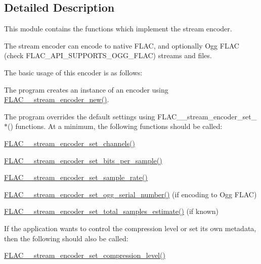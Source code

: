 \subsection{Detailed Description}
This module contains the functions which implement the stream encoder. 

The stream encoder can encode to native F\+L\+AC, and optionally Ogg F\+L\+AC (check F\+L\+A\+C\+\_\+\+A\+P\+I\+\_\+\+S\+U\+P\+P\+O\+R\+T\+S\+\_\+\+O\+G\+G\+\_\+\+F\+L\+AC) streams and files.

The basic usage of this encoder is as follows\+:
\begin{DoxyItemize}
\item The program creates an instance of an encoder using \hyperlink{group__flac__stream__encoder_ga35f3d94452bcf0a90a31c7d770b200bc}{F\+L\+A\+C\+\_\+\+\_\+stream\+\_\+encoder\+\_\+new()}.
\item The program overrides the default settings using F\+L\+A\+C\+\_\+\+\_\+stream\+\_\+encoder\+\_\+set\+\_\+$\ast$() functions. At a minimum, the following functions should be called\+:
\begin{DoxyItemize}
\item \hyperlink{group__flac__stream__encoder_gabfc9c883c124a849b5b42a87c30e10a5}{F\+L\+A\+C\+\_\+\+\_\+stream\+\_\+encoder\+\_\+set\+\_\+channels()}
\item \hyperlink{group__flac__stream__encoder_ga5a21cf7f86a81df6ba72714a6b917aa3}{F\+L\+A\+C\+\_\+\+\_\+stream\+\_\+encoder\+\_\+set\+\_\+bits\+\_\+per\+\_\+sample()}
\item \hyperlink{group__flac__stream__encoder_ga108c3f4fbdcaa744ddbb125f91cb3838}{F\+L\+A\+C\+\_\+\+\_\+stream\+\_\+encoder\+\_\+set\+\_\+sample\+\_\+rate()}
\item \hyperlink{group__flac__stream__encoder_ga646c9800d42620a6c504fbdfbd092666}{F\+L\+A\+C\+\_\+\+\_\+stream\+\_\+encoder\+\_\+set\+\_\+ogg\+\_\+serial\+\_\+number()} (if encoding to Ogg F\+L\+AC)
\item \hyperlink{group__flac__stream__encoder_ga0d3f45052f2f7379c73e2b027c7f956c}{F\+L\+A\+C\+\_\+\+\_\+stream\+\_\+encoder\+\_\+set\+\_\+total\+\_\+samples\+\_\+estimate()} (if known)
\end{DoxyItemize}
\item If the application wants to control the compression level or set its own metadata, then the following should also be called\+:
\begin{DoxyItemize}
\item \hyperlink{group__flac__stream__encoder_ga03495bcd0aae71116c701b0dcf311c4b}{F\+L\+A\+C\+\_\+\+\_\+stream\+\_\+encoder\+\_\+set\+\_\+compression\+\_\+level()}

\end{DoxyItemize}
\end{DoxyItemize}
